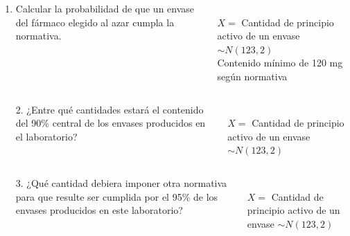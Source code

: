 \documentclass[aspectratio=149,10pt,xcolor=dvipsnames,t]{beamer}
\begin{document}

\begin{frame}
\begin{columns}
\begin{column}[T]{0.6\textwidth}
\begin{enumerate}
\item Calcular la probabilidad de que un envase del fármaco elegido al azar cumpla la normativa.
\end{enumerate}
\end{column}
\begin{column}[T]{0.4\textwidth}
\\
$X=$ Cantidad de principio activo de un envase $\sim N(123,2)$\\
Contenido mínimo de 120 mg según normativa
\end{column}
\end{columns}
\end{frame}


\begin{frame}
\begin{columns}
\begin{column}[T]{0.6\textwidth}
\begin{enumerate}
\item[2.] ¿Entre qué cantidades estará el contenido del 90\% central de los envases producidos en el laboratorio? 
\end{enumerate}
\end{column}
\begin{column}[T]{0.4\textwidth}
\\
$X=$ Cantidad de principio activo de un envase $\sim N(123,2)$
\end{column}
\end{columns}
\end{frame}


\begin{frame}
\begin{columns}
\begin{column}[T]{0.6\textwidth}
\begin{enumerate}
\item[3.]¿Qué cantidad debiera imponer otra normativa para que resulte ser cumplida por el 95\% de los envases producidos
en este laboratorio? 
\end{enumerate}
\end{column}
\begin{column}[T]{0.4\textwidth}
\\
$X=$ Cantidad de principio activo de un envase $\sim N(123,2)$
\end{column}
\end{columns}
\end{frame}
\end{document}
